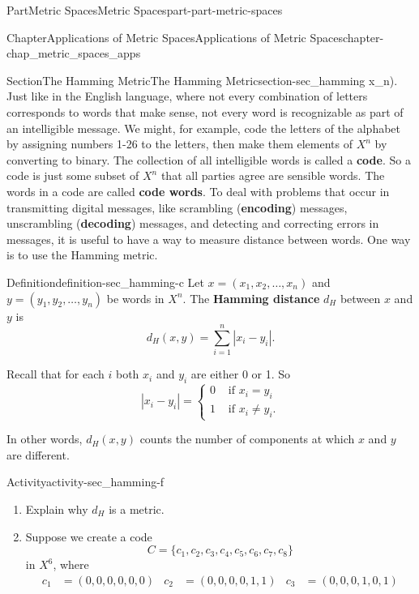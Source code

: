 \documentclass[oneside,10pt,]{book}
\newcommand{\terminology}[1]{\textbf{#1}}
\numberwithin{equation}{chapter}
\newcommand{\amp}{&}
\begin{document}
\begin{partptx}{Part}{Metric Spaces}{}{Metric Spaces}{}{}{part-part-metric-spaces}
\begin{chapterptx}{Chapter}{Applications of Metric Spaces}{}{Applications of Metric Spaces}{}{}{chapter-chap_metric_spaces_apps}
\begin{sectionptx}{Section}{The Hamming Metric}{}{The Hamming Metric}{}{}{section-sec_hamming}
x_n)\). Just like in the English language, where not every combination of letters corresponds to words that make sense, not every word is recognizable as part of an intelligible message. We might, for example, code the letters of the alphabet by assigning numbers 1-26 to the letters, then make them elements of \(X^n\) by converting to binary. The collection of all intelligible words is called a \terminology{code}. So a code is just some subset of \(X^n\) that all parties agree are sensible words. The words in a code are called \terminology{code words}. To deal with problems that occur in transmitting digital messages, like scrambling (\terminology{encoding}) messages, unscrambling (\terminology{decoding}) messages, and detecting and correcting errors in messages, it is useful to have a way to measure distance between words. One way is to use the Hamming metric.%
\begin{definition}{Definition}{}{definition-sec_hamming-c}%
%
Let \(x = (x_1, x_2, \ldots,
x_n)\) and \(y = (y_1, y_2, \ldots,
y_n)\) be words in \(X^n\). The \terminology{Hamming distance} \(d_H\) between \(x\) and \(y\) is%
\begin{equation*}
d_H(x,y) = \sum_{i=1}^n | x_i-y_i |\text{.}
\end{equation*}
%
\end{definition}
Recall that for each \(i\) both \(x_i\) and \(y_i\) are either 0 or 1. So%
\begin{equation*}
| x_i-y_i | = \begin{cases}0 \amp \text{ if }  x_i=y_i \\ 1 \amp \text{ if }  x_i \neq y_i. \end{cases}
\end{equation*}
%
\par
In other words, \(d_H(x,y)\) counts the number of components at which \(x\) and \(y\) are different.%
\begin{activity}{Activity}{}{activity-sec_hamming-f}%
\begin{enumerate}[font=\bfseries,label=(\alph*),ref=\alph*]%
\item{}Explain why \(d_H\) is a metric.%
\item{}Suppose we create a code%
\begin{equation*}
C = \{c_1,c_2,c_3,c_4,c_5,c_6,c_7,c_8\}
\end{equation*}
in \(X^6\), where%
\begin{align*}
c_1 \amp = (0,0,0,0,0,0) \amp c_2 \amp =( 0,0,0,0,1,1) \amp c_3 \amp = (0,0,0,1,0,1)\\

\end{align*}
\end{enumerate}
\end{activity}
\end{sectionptx}
\end{chapterptx}
\end{partptx}
\end{document}
